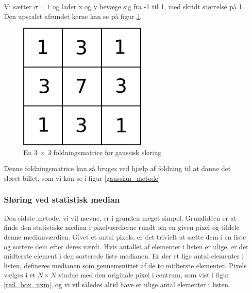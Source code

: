 {Vi sætter $\sigma = 1$ og lader x og y bevæge sig fra -1 til 1, med skridt størrelse
på 1. Den upscalet afrundet kerne kan se på figur \ref{gauss}.

\begin{figure}[h]
	\begin{center}
		\includegraphics[scale=0.5,angle=0]{afsnit/vores_implementation/billeder/sloering/gauss}
	\end{center}
	\caption[]{En $3~\times{}~3$ foldningsmatrice for gaussisk sløring}
	\label{gauss}
\end{figure}

Denne foldningsmatrice kan så bruges ved hjælp af foldning til at danne det sløret
billet, som vi kan se i figur \ref{gaussian_metode}

\subsubsection*{Sløring ved statistisk median}
Den sidste metode, vi vil nævne, er i grunden meget simpel. Grundidéen
er at finde den statistiske median i pixelværdierne rundt om en given
pixel og tildele denne medianværdien. Givet et antal pixels, er det
trivielt at sætte dem i en liste og sortere dem efter deres værdi. Hvis
antallet af elementer i listen er ulige, er det midterste element i den
sorterede liste medianen. Er der et lige antal elementer i listen,
defineres medianen som gennemsnittet af de to midterste elementer.
Pixels vælges i et $N \times N$ vindue med den originale pixel i
centrum, som vist i figur \ref{red_box_nxm}, og vi vil således altid
have et ulige antal elementer i listen.

}
